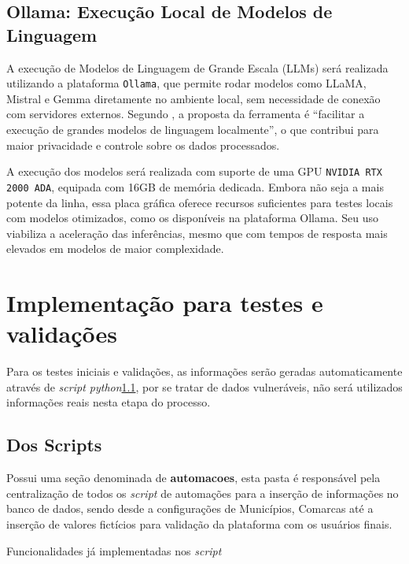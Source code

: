 \subsection{Ollama: Execução Local de Modelos de Linguagem}
\par A execução de Modelos de Linguagem de Grande Escala (LLMs) será realizada utilizando a plataforma \texttt{Ollama}, que permite rodar modelos como LLaMA, Mistral e Gemma diretamente no ambiente local, sem necessidade de conexão com servidores externos. Segundo , a proposta da ferramenta é “facilitar a execução de grandes modelos de linguagem localmente”, o que contribui para maior privacidade e controle sobre os dados processados.
\par A execução dos modelos será realizada com suporte de uma GPU \texttt{NVIDIA RTX 2000 ADA}, equipada com 16GB de memória dedicada. Embora não seja a mais potente da linha, essa placa gráfica oferece recursos suficientes para testes locais com modelos otimizados, como os disponíveis na plataforma Ollama. Seu uso viabiliza a aceleração das inferências, mesmo que com tempos de resposta mais elevados em modelos de maior complexidade.


\section{Implementação para testes e validações}
\par Para os testes iniciais e validações, as informações serão geradas automaticamente através de \textit{script python}\ref{script}, por se tratar de dados vulneráveis, não será utilizados informações reais nesta etapa do processo.

\subsection{Dos Scripts}\label{script}
\par Possui uma seção denominada de \textbf{automacoes}, esta pasta é responsável pela centralização de todos os \textit{script} de automações para a inserção de informações no banco de dados, sendo desde a configurações de Municípios, Comarcas até a inserção de valores fictícios para validação da plataforma com os usuários finais.
\par Funcionalidades já implementadas nos \textit{script}

